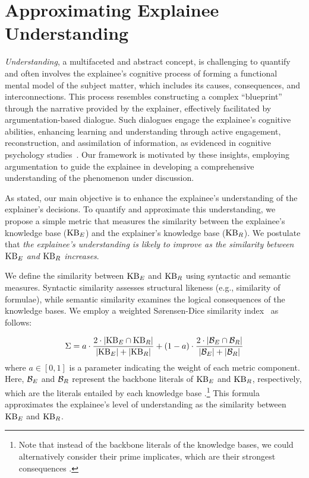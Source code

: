 \documentclass{article}
\begin{document}
\section{Approximating Explainee Understanding}
\label{understand}





\textit{Understanding}, a multifaceted and abstract concept, is challenging to quantify and often involves the explainee’s cognitive process of forming a functional mental model of the subject matter, which includes its causes, consequences, and interconnections. This process resembles constructing a complex ``blueprint'' through the narrative provided by the explainer, effectively facilitated by argumentation-based dialogue. Such dialogues engage the explainee’s cognitive abilities, enhancing learning and understanding through active engagement, reconstruction, and assimilation of information, as evidenced in cognitive psychology studies~\citep{johnson1983mental,mercier2011humans}. Our framework is motivated by these insights, employing argumentation to guide the explainee in developing a comprehensive understanding of the phenomenon under discussion.


As stated, our main objective is to enhance the explainee's understanding of the explainer's decisions. To quantify and approximate this understanding, we propose a simple metric that measures the similarity between the explainee's knowledge base ($\mathrm{KB}_E$) and the explainer's knowledge base ($\mathrm{KB}_R$). We postulate that \textit{the explainee's understanding is likely to improve as the similarity between $\mathrm{KB}_E$ and $\mathrm{KB}_R$ increases}.


We define the similarity between $\mathrm{KB}_E$ and $\mathrm{KB}_R$ using syntactic and semantic measures. Syntactic similarity assesses structural likeness (e.g., similarity of formulae), while semantic similarity examines the logical consequences of the knowledge bases. We employ a weighted Sørensen-Dice similarity index~\citep{dice1945measures,sorensen1948method} as follows:


\begin{equation}
    \Sigma = a \cdot \frac{2\cdot|\mathrm{KB}_E \cap \mathrm{KB}_R|}{|\mathrm{KB}_E
|+|\mathrm{KB}_R|} +(1-a)\cdot \frac{2\cdot|\mathcal{B}_E \cap \mathcal{B}_R|}{|\mathcal{B}_E|+|\mathcal{B}_R|}
\end{equation}
\noindent where $a \in [0,1]$ is a parameter indicating the weight of each metric component. Here, $\mathcal{B}_E$ and $\mathcal{B}_R$ represent the backbone literals of $\mathrm{KB}_E$ and $\mathrm{KB}_R$, respectively, which are the literals entailed by each knowledge base \citep{parkes1997clustering}.\footnote{Note that instead of the backbone literals of the knowledge bases, we could alternatively consider their prime implicates, which are their strongest consequences \cite{jackson1992computing}.} This formula approximates the explainee's level of understanding as the similarity between $\mathrm{KB}_E$ and $\mathrm{KB}_R$.
\end{document}
